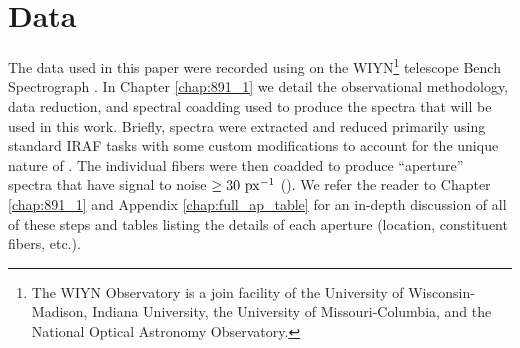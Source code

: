 \section{Data}
\label{891_2:sec:data}
The data used in this paper were recorded using \GP \citep{Wood12} on
the WIYN\footnote{The WIYN Observatory is a join facility of the
  University of Wisconsin-Madison, Indiana University, the University
  of Missouri-Columbia, and the National Optical Astronomy
  Observatory.} telescope Bench Spectrograph
\citep{Barden94,Bershady08,Knezek10}. In Chapter \ref{chap:891_1} we
detail the observational methodology, data reduction, and spectral
coadding used to produce the spectra that will be used in this
work. Briefly, spectra were extracted and reduced primarily using
standard IRAF tasks with some custom modifications to account for the
unique nature of \GP. The individual fibers were then coadded to
produce ``aperture'' spectra that have signal to noise $\geq
30~\mathrm{px^{-1}} $ (). We refer the reader to
Chapter \ref{chap:891_1} and Appendix \ref{chap:full_ap_table} for an
in-depth discussion of all of these steps and tables listing the
details of each aperture (location, constituent fibers, etc.).
